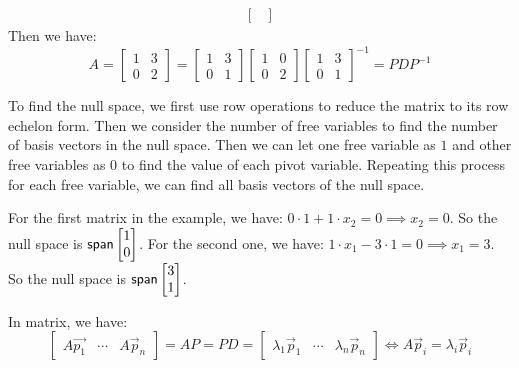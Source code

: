 \begin{example}
\begin{align*}
\begin{bmatrix}
                                                                        \end{bmatrix}
  \end{align*}
  Then we have:
  \[
    A = \begin{bmatrix}
      1 & 3 \\
      0 & 2
    \end{bmatrix} = \begin{bmatrix}
      1 & 3 \\
      0 & 1
    \end{bmatrix} \begin{bmatrix}
      1 & 0 \\
      0 & 2
    \end{bmatrix} \begin{bmatrix}
      1 & 3 \\
      0 & 1
    \end{bmatrix}^{-1} = P D P^{-1}
  \]
\end{example}
\begin{remark}
  To find the null space, we first use row operations to reduce the matrix to its row echelon form. Then we consider the number of free variables to find the number of basis vectors in the null space. Then we can let one free variable as $1$ and other free variables as $0$ to find the value of each pivot variable. Repeating this process for each free variable, we can find all basis vectors of the null space.

  For the first matrix in the example, we have: $0 \cdot 1 + 1 \cdot x_2 = 0 \implies x_2 = 0$. So the null space is $\operatorname{\text{\normalfont\sffamily span}} \begin{bmatrix} 1 \\ 0 \end{bmatrix}$. For the second one, we have: $1 \cdot x_1 - 3 \cdot 1 = 0 \implies x_1 = 3$. So the null space is $\operatorname{\text{\normalfont\sffamily span}} \begin{bmatrix} 3 \\ 1 \end{bmatrix}$.
\end{remark}

In matrix, we have:
\[
  \begin{bmatrix}
    A\vec{p_1} & \cdots & A\vec{p}_n
  \end{bmatrix} = AP = PD = \begin{bmatrix}
    \lambda_1 \vec{p}_1 & \cdots & \lambda_n \vec{p}_n
  \end{bmatrix} \iff A\vec{p}_i = \lambda_i \vec{p}_i
\]

